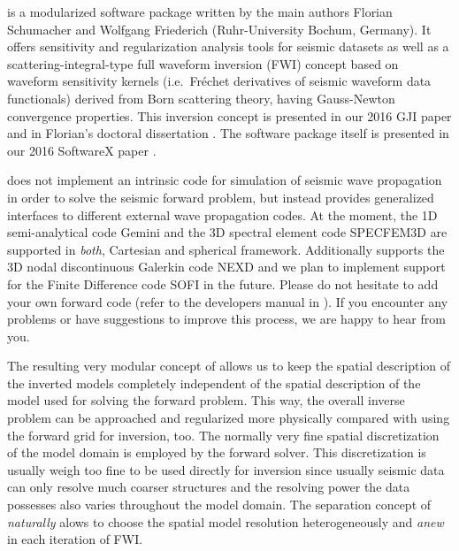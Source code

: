 
%
%
%
\ASKI{} is a modularized software package written by the main authors Florian Schumacher and
Wolfgang Friederich (Ruhr-University Bochum, Germany). It offers sensitivity and regularization 
analysis tools for seismic datasets
as well as a scattering-integral-type full waveform inversion (FWI) concept based on waveform sensitivity 
kernels (i.e.\ Fr\'echet derivatives of seismic waveform data functionals) derived from Born scattering theory,
having Gauss-Newton convergence properties.
This inversion concept is presented in our 2016 GJI paper \cite{Schumacher16} and in Florian's doctoral
dissertation \cite{_743d334d-dfa4-4a16-8cc5-91cdadc95271}. The software package \ASKI{} itself is presented
in our 2016 SoftwareX paper \cite{Schumacher16b}.

\ASKI{} does not implement an intrinsic code for simulation of seismic wave propagation in order to 
solve the seismic forward problem, but instead provides generalized interfaces to different external wave 
propagation codes. At the moment, the 1D semi-analytical code Gemini \cite{friederich_wd1995} and the 3D spectral 
element code SPECFEM3D \cite{TrKoLi08} are supported in \emph{both}, Cartesian and spherical framework. 
Additionally \ASKI{} supports the 3D nodal discontinuous Galerkin code NEXD \cite{Lambrecht.2015}
and we plan to implement support for the Finite Difference code SOFI \cite{bohlen2002parallel}
in the future. 
Please do not hesitate to add your own forward code (refer to the \ASKI{} developers manual in
). If you encounter any problems or have suggestions to improve this
process, we are happy to hear from you.

The resulting very modular concept of \ASKI{} allows us to keep the spatial description of the inverted 
models completely independent of the spatial description of the model used for solving the forward 
problem. This way, the overall inverse problem can be approached and regularized more physically compared
with using the forward grid for inversion, too. The normally very fine spatial discretization of the model
domain is employed by the forward solver. This discretization is usually weigh too fine to be used
directly for inversion since usually seismic data can only resolve much coarser structures and the
resolving power the data possesses also varies throughout the model domain. 
The separation concept of \ASKI{} \emph{naturally} alows to choose the spatial model
resolution heterogeneously and \emph{anew} in each iteration of FWI.

